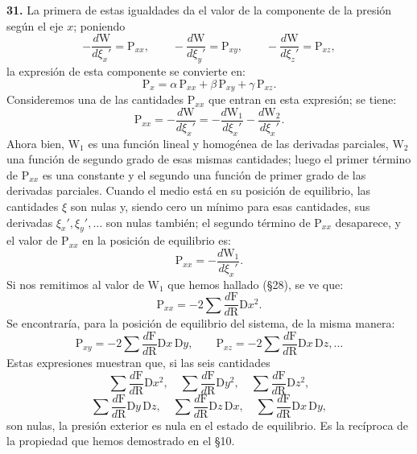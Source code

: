 \noindent\textbf{31.} La primera de estas igualdades da el valor de la
componente de la presión según el eje $x$; poniendo
\[
-\frac{d\mathrm{W}}{d\xi_x'}=\mathrm{P}_{xx},\qquad
-\frac{d\mathrm{W}}{d\xi_y'}=\mathrm{P}_{xy},\qquad
-\frac{d\mathrm{W}}{d\xi_z'}=\mathrm{P}_{xz},
\]
la expresión de esta componente se convierte en:
\[
\mathrm{P}_x=\alpha\,\mathrm{P}_{xx}+\beta\,\mathrm{P}_{xy}+\gamma\,\mathrm{P}_{xz}.
\]
Consideremos una de las cantidades $\mathrm{P}_{xx}$ que entran en esta
expresión; se tiene:
\[
\mathrm{P}_{xx}=-\frac{d\mathrm{W}}{d\xi_x'}=-\frac{d\mathrm{W}_1}{d\xi_x'}-\frac{d\mathrm{W}_2}{d\xi_x'}.
\]
Ahora bien, $\mathrm{W}_1$ es una función lineal y homogénea de las
derivadas parciales, $\mathrm{W}_2$ una función de segundo grado de esas
mismas cantidades; luego el primer término de $\mathrm{P}_{xx}$ es una
constante y el segundo una función de primer grado de las derivadas
parciales. Cuando el medio está en su posición de equilibrio, las
cantidades $\xi$ son nulas y, siendo cero un mínimo para esas cantidades,
sus derivadas $\xi_x',\xi_y',\ldots$ son nulas también; el segundo término
de $\mathrm{P}_{xx}$ desaparece, y el valor de $\mathrm{P}_{xx}$ en la
posición de equilibrio es:
\[
\mathrm{P}_{xx}=-\frac{d\mathrm{W}_1}{d\xi_x'}.
\]
Si nos remitimos al valor de $\mathrm{W}_1$ que hemos hallado (§28), se ve
que:
\[
\mathrm{P}_{xx}=-2\sum\frac{d\mathrm{F}}{d\mathrm{R}}\mathrm{D}x^2.
\]
Se encontraría, para la posición de equilibrio del sistema, de la misma
manera:
\[
\mathrm{P}_{xy}=-2\sum\frac{d\mathrm{F}}{d\mathrm{R}}\mathrm{D}x\,\mathrm{D}y,
\qquad \mathrm{P}_{xz}=-2\sum\frac{d\mathrm{F}}{d\mathrm{R}}\mathrm{D}x\,\mathrm{D}z,\ldots
\]
Estas expresiones muestran que, si las seis cantidades
\[
\sum\frac{d\mathrm{F}}{d\mathrm{R}}\mathrm{D}x^2,\quad
\sum\frac{d\mathrm{F}}{d\mathrm{R}}\mathrm{D}y^2,\quad
\sum\frac{d\mathrm{F}}{d\mathrm{R}}\mathrm{D}z^2,
\]
\[
\sum\frac{d\mathrm{F}}{d\mathrm{R}}\mathrm{D}y\,\mathrm{D}z,\quad
\sum\frac{d\mathrm{F}}{d\mathrm{R}}\mathrm{D}z\,\mathrm{D}x,\quad
\sum\frac{d\mathrm{F}}{d\mathrm{R}}\mathrm{D}x\,\mathrm{D}y,
\]
son nulas, la presión exterior es nula en el estado de equilibrio. Es la
recíproca de la propiedad que hemos demostrado en el §10.

